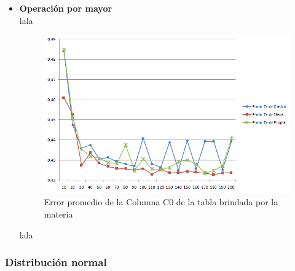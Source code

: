 \begin{itemize}
\item \textbf{Operaci\'on por mayor} \\

\quad lala \\

\begin{figure}[H]
	  \begin{center}
	    \includegraphics[scale=.80]{imagenes/parametroVariableC0Greater.png}
	    \caption{Error promedio de la Columna C0 de la tabla brindada por la materia} 
	    \label{fig:C0_variando_parametro_greater}
	  \end{center}
\end{figure}

\quad lala \\

\end{itemize}

\subsubsection{Distribuci\'on normal}

